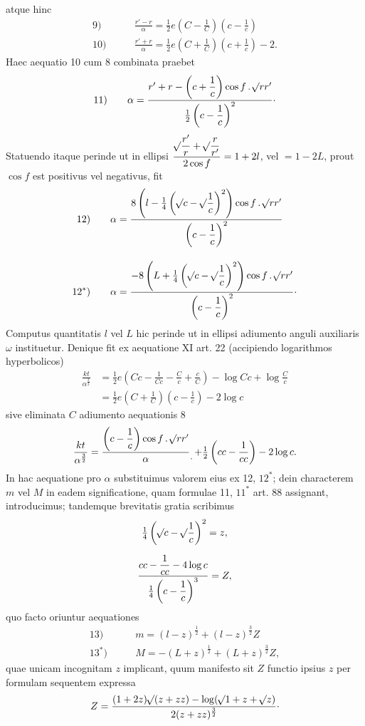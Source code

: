 \noindent atque hinc
\[
\begin{aligned}
\mathrm{9)}\qquad&\frac{r'-r}\alpha=\tfrac12e\left(C-\frac1C\right)\left(c-\frac1c\right)\\[.6em]
\mathrm{10)}\qquad&\frac{r'+r}\alpha=\tfrac12e\left(C+\frac1C\right)\left(c+\frac1c\right)-2.
\end{aligned}
\]
\noindent Haec aequatio 10 cum 8 combinata praebet
\[
\mathrm{11)}\qquad\alpha=\frac{r'+r-\left(c+\dfrac1c\right)\cos f\,\mathpunct{.}\mathord{{}^{}\!\surd}rr'}{\tfrac12\left(c-\dfrac1c\right)^2}\mathpunct{\cdot}
\]
\noindent Statuendo itaque perinde ut in ellipsi $\dfrac{\mathord{{}^{}\!\surd}\dfrac{r'}r+\mathord{{}^{}\!\surd}\dfrac r{r'}}{2\cos f}=1+2l$, vel $=1-2L$, prout $\cos f$ est positivus vel negativus, fit
\[
\begin{aligned}
\mathrm{12)}\qquad&\alpha=\frac{8\left(l-\tfrac14\left(\mathord{{}^{}\!\surd}c-\mathord{{}^{}\!\surd}\dfrac1c\right)^2\right)\cos f\,\mathpunct{.}\mathord{{}^{}\!\surd}rr'}{\left(c-\dfrac1c\right)^2}\\[1em]
\mathrm{12^*)}\qquad&\alpha=\frac{-8\left(L+\tfrac14\left(\mathord{{}^{}\!\surd}c-\mathord{{}^{}\!\surd}\dfrac1c\right)^2\right)\cos f\,\mathpunct{.}\mathord{{}^{}\!\surd}rr'}{\left(c-\dfrac1c\right)^2}\mathpunct{\cdot}
\end{aligned}
\]
\noindent Computus quantitatis $l$ vel $L$ hic perinde ut in ellipsi adiumento anguli auxiliaris $\omega$ instituetur. Denique fit ex aequatione XI art. 22 (accipiendo logarithmos hyperbolicos)
\[
\begin{aligned}
\frac{kt}{\alpha^{\frac32}}&=\tfrac12e\left(Cc-\frac1{Cc}-\frac Cc+\frac cC\right)-\log Cc+\log\frac Cc\\[.6em]
&=\tfrac12e\left(C+\frac1C\right)\left(c-\frac1c\right)-2\log c
\end{aligned}
\]
\noindent sive eliminata $C$ adiumento aequationis 8
\[
\frac{kt}{\alpha^{\frac32}}=\frac{\left(c-\dfrac1c\right)\cos f\,\mathpunct{.}\BareRoot{rr'}}\alpha\mathpunct{\raisebox{-1ex}{.}}+\tfrac12\left(cc-\frac1{cc}\right)-2\log c.
\]
\noindent In hac aequatione pro $\alpha$ substituimus valorem eius ex 12, $12^*$; dein characterem $m$ vel $M$ in eadem significatione, quam formulae 11, $11^*$ art. 88 assignant, introducimus; tandemque brevitatis gratia scribimus
\[
\begin{gathered}
\tfrac14\left(\mathord{{}^{}\!\surd}c-\mathord{{}^{}\!\surd}\frac1c\right)^2=z,\\[.6em]
\frac{cc-\dfrac1{cc}-4\log c}{\tfrac14\left(c-\dfrac1c\right)^3}=Z,
\end{gathered}
\]
\noindent quo facto oriuntur aequationes
\[
\begin{aligned}
\mathrm{13)}\qquad&m=(l-z)^{\frac12}+(l-z)^{\frac32}Z\\[.6em]
\mathrm{13^*)}\qquad&M=-(L+z)^{\frac12}+(L+z)^{\frac32}Z,
\end{aligned}
\]
\noindent quae unicam incognitam $z$ implicant, quum manifesto sit $Z$ functio ipsius $z$ per formulam sequentem expressa
\[
Z=\frac{(1+2z)\mathord{{}^{}\!\surd}(z+zz)-\log(\mathord{{}^{}\!\surd}1+z+\mathord{{}^{}\!\surd}z)}{2(z+zz)^{\frac32}}\mathpunct{\cdot}
\]
